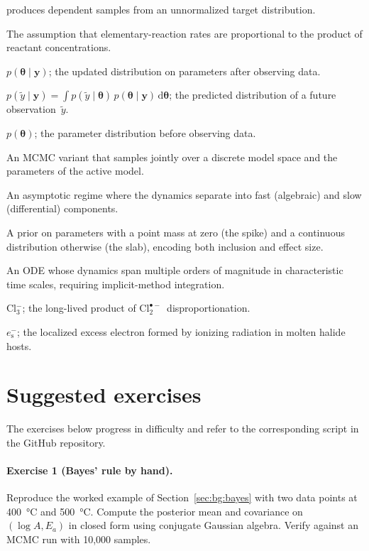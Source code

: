 \documentclass[12pt]{article}
\theoremstyle{plain}
\theoremstyle{definition}
\theoremstyle{remark}
\newcommand{\eS}{\ensuremath{e_{\mathrm{s}}^{-}}\xspace}
\newcommand{\Clt}{\ensuremath{\mathrm{Cl}_2^{\bullet-}}\xspace}
\renewcommand{\d}{\mathrm{d}}
\begin{document}
\begin{description}
  produces dependent samples from an unnormalized target distribution.
\item[Mass action.] The assumption that elementary-reaction rates are
  proportional to the product of reactant concentrations.
\item[Posterior.] $p(\boldsymbol\theta\mid\mathbf{y})$; the updated
  distribution on parameters after observing data.
\item[Posterior predictive.] $p(\tilde y\mid\mathbf{y}) =
  \int p(\tilde y\mid\boldsymbol\theta)\,p(\boldsymbol\theta\mid\mathbf{y})\,
  \d\boldsymbol\theta$; the predicted distribution of a future
  observation~$\tilde y$.
\item[Prior.] $p(\boldsymbol\theta)$; the parameter distribution before
  observing data.
\item[Reversible-jump MCMC.] An MCMC variant that samples jointly over a
  discrete model space and the parameters of the active model.
\item[Singular perturbation.] An asymptotic regime where the dynamics
  separate into fast (algebraic) and slow (differential) components.
\item[Spike-and-slab prior.] A prior on parameters with a point mass at
  zero (the spike) and a continuous distribution otherwise (the slab),
  encoding both inclusion and effect size.
\item[Stiff ODE.] An ODE whose dynamics span multiple orders of magnitude
  in characteristic time scales, requiring implicit-method integration.
\item[Trichloride.] Cl$_3^-$; the long-lived product of \Clt\ disproportionation.
\item[Solvated electron.] \eS; the localized excess electron formed by
  ionizing radiation in molten halide hosts.
\end{description}

\section{Suggested exercises}\label{app:exercises}

The exercises below progress in difficulty and refer to the corresponding
script in the GitHub repository.

\paragraph{Exercise 1 (Bayes' rule by hand).}
Reproduce the worked example of Section~\ref{sec:bg:bayes} with two data
points at \SI{400}{\celsius} and \SI{500}{\celsius}.  Compute the posterior
mean and covariance on $(\log A, E_a)$ in closed form using conjugate
Gaussian algebra.  Verify against an MCMC run with 10,000 samples.
\end{document}

